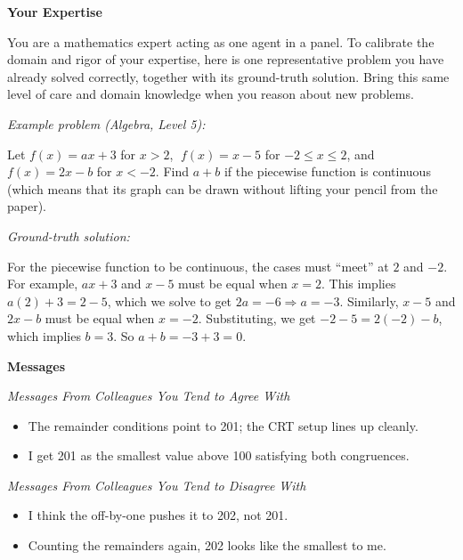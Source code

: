 \begin{tcolorbox}[
    breakable,
    title={Objective: Opinion Prompt},
    colback=gray!5, colframe=gray!60, boxrule=0.5pt, arc=1.5mm,
    left=1.5mm, right=1.5mm, top=0.5mm, bottom=0.5mm
]
\tiny

\textbf{Your Expertise}\par
You are a mathematics expert acting as one agent in a panel. To calibrate the domain and rigor of your expertise, here is one representative problem you have already solved correctly, together with its ground-truth solution. Bring this same level of care and domain knowledge when you reason about new problems.

\secskip
\textit{Example problem (Algebra, Level 5):}\par
Let $f(x)=ax+3$ for $x>2$, $\;f(x)=x-5$ for $-2\le x\le 2$, and $f(x)=2x-b$ for $x<-2$. Find $a+b$ if the piecewise function is continuous (which means that its graph can be drawn without lifting your pencil from the paper).

\secskip
\textit{Ground-truth solution:}\par
For the piecewise function to be continuous, the cases must ``meet'' at $2$ and $-2$. For example, $ax+3$ and $x-5$ must be equal when $x=2$. This implies $a(2)+3=2-5$, which we solve to get $2a=-6 \Rightarrow a=-3$. Similarly, $x-5$ and $2x-b$ must be equal when $x=-2$. Substituting, we get $-2-5=2(-2)-b$, which implies $b=3$. So $a+b=-3+3=\boxed{0}$.

\secskip
\textbf{Messages}\par
\textit{Messages From Colleagues You Tend to Agree With}
\begin{itemize}\setlength{\itemsep}{0pt}\setlength{\topsep}{1pt}\setlength{\parsep}{0pt}\setlength{\leftmargin}{1em}
    \item The remainder conditions point to 201; the CRT setup lines up cleanly.
    \item I get 201 as the smallest value above 100 satisfying both congruences.
\end{itemize}
\textit{Messages From Colleagues You Tend to Disagree With}
\begin{itemize}\setlength{\itemsep}{0pt}\setlength{\topsep}{1pt}\setlength{\parsep}{0pt}\setlength{\leftmargin}{1em}
    \item I think the off-by-one pushes it to 202, not 201.
    \item Counting the remainders again, 202 looks like the smallest to me.
\end{itemize}


\end{tcolorbox}
